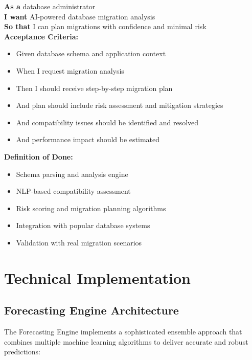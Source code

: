 \begin{tcolorbox}[colback=lightgray, colframe=primaryblue, title=US-2.4: Intelligent Migration Planning]
\textbf{As a} database administrator \\
\textbf{I want} AI-powered database migration analysis \\
\textbf{So that} I can plan migrations with confidence and minimal risk \\

\textbf{Acceptance Criteria:}
\begin{itemize}
    \item Given database schema and application context
    \item When I request migration analysis
    \item Then I should receive step-by-step migration plan
    \item And plan should include risk assessment and mitigation strategies
    \item And compatibility issues should be identified and resolved
    \item And performance impact should be estimated
\end{itemize}

\textbf{Definition of Done:}
\begin{itemize}
    \item Schema parsing and analysis engine
    \item NLP-based compatibility assessment
    \item Risk scoring and migration planning algorithms
    \item Integration with popular database systems
    \item Validation with real migration scenarios
\end{itemize}
\end{tcolorbox}

\section{Technical Implementation}

\subsection{Forecasting Engine Architecture}

The Forecasting Engine implements a sophisticated ensemble approach that combines multiple machine learning algorithms to deliver accurate and robust predictions:

